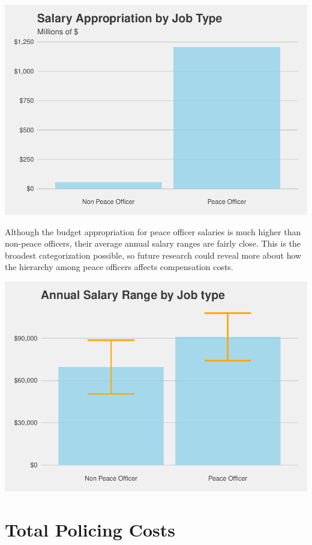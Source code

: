 \documentclass[
]{article}
\begin{document}
\begin{center}\includegraphics{cpd_budget_analysis_files/figure-latex/appropriation by PO status-1} \end{center}

Although the budget appropriation for peace officer salaries is much
higher than non-peace officers, their average annual salary ranges are
fairly close. This is the broadest categorization possible, so future
research could reveal more about how the hierarchy among peace officers
affects compensation costs.

\begin{center}\includegraphics{cpd_budget_analysis_files/figure-latex/PO vs. non-PO salary range-1} \end{center}

\hypertarget{total-policing-costs}{%
\section{Total Policing Costs}\label{total-policing-costs}}
\end{document}
